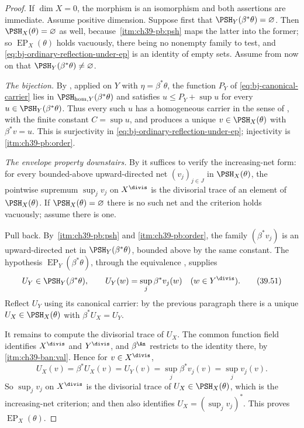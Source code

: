\begin{proof}
If $\dim X=0$, the morphism is an isomorphism and both assertions are
immediate.  Assume positive dimension.  Suppose first that
$\PSH_Y(\beta^*\theta)=\varnothing$.  Then
$\PSH_X(\theta)=\varnothing$ as well, because
\,\cref{itm:ch39-pb:psh} maps the latter into the
former; so $\operatorname{EP}_X(\theta)$ holds vacuously, there being no
nonempty family to test, and \eqref{eq:bj-ordinary-reflection-under-ep} is
an identity of empty sets.  Assume from now on that
$\PSH_Y(\beta^*\theta)\ne\varnothing$.

\emph{The bijection.}  By , applied on $Y$
with $\eta=\beta^*\theta$, the function $P_Y$ of
\eqref{eq:bj-canonical-carrier} lies in
$\PSH_{\mathrm{hom},Y}(\beta^*\theta)$ and satisfies
$u\le P_Y+\sup u$ for every $u\in\PSH_Y(\beta^*\theta)$.  Thus every
such $u$ has a homogeneous carrier in the sense of
, with the finite constant $C=\sup u$,
and  produces a unique
$v\in\PSH_X(\theta)$ with $\beta^*v=u$.  This is surjectivity in
\eqref{eq:bj-ordinary-reflection-under-ep}; injectivity is
\,\cref{itm:ch39-pb:order}.

\emph{The envelope property downstairs.}  By
 it suffices to verify the
increasing-net form: for every bounded-above upward-directed net
$(v_j)_{j\in J}$ in $\PSH_X(\theta)$, the pointwise supremum
$\sup_jv_j$ on $X^{\divis}$ is the divisorial trace of an element of
$\PSH_X(\theta)$.  If $\PSH_X(\theta)=\varnothing$ there is no such net
and the criterion holds vacuously; assume there is one.

Pull back.  By \,\cref{itm:ch39-pb:psh} and
\cref{itm:ch39-pb:order}, the family $(\beta^*v_j)$ is an upward-directed
net in $\PSH_Y(\beta^*\theta)$, bounded above by the same constant.  The
hypothesis $\operatorname{EP}_Y(\beta^*\theta)$, through the equivalence
, supplies
\[
 U_Y\in\PSH_Y(\beta^*\theta),\qquad
 U_Y(w)=\sup_j\beta^*v_j(w)
 \quad(w\in Y^{\divis}).
\tag{39.51}\label{eq:bj-source-net-limit}
\]
Reflect $U_Y$ using its canonical carrier: by the previous paragraph there
is a unique $U_X\in\PSH_X(\theta)$ with $\beta^*U_X=U_Y$.

It remains to compute the divisorial trace of $U_X$.  The common function
field identifies $X^{\divis}$ and $Y^{\divis}$, and $\beta^{\An}$
restricts to the identity there, by
\,\cref{itm:ch39-ban:val}.  Hence for
$v\in X^{\divis}$,
\[
 U_X(v)=\beta^*U_X(v)=U_Y(v)
 =\sup_j\beta^*v_j(v)=\sup_jv_j(v).
\]
So $\sup_jv_j$ on $X^{\divis}$ is the divisorial trace of
$U_X\in\PSH_X(\theta)$, which is the increasing-net criterion; and
 then also identifies
$U_X=(\sup_jv_j)^*$.  This proves
$\operatorname{EP}_X(\theta)$.
\end{proof}

